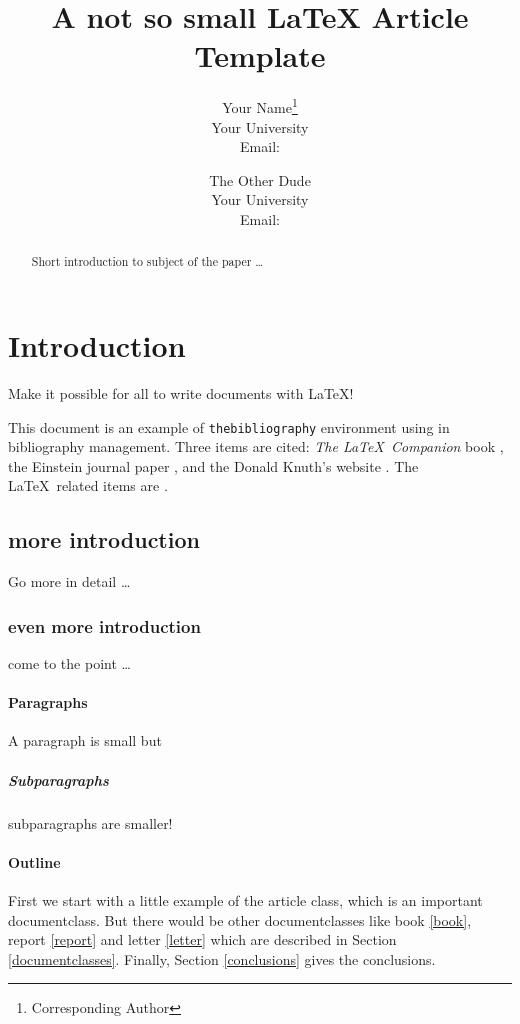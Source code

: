 \documentclass[11pt, a4paper, twoside]{article}
\title{A not so small \LaTeX{} Article Template}
\author{Your Name\thanks{Corresponding Author}  \\
	    Your University\\ Email:  \\
	\and 
	The Other Dude \\
	Your University\\ Email: \\
	}
\date{}
\begin{document}
\maketitle


\begin{abstract}
Short introduction to subject of the paper \ldots 
\end{abstract}




\section{Introduction}
Make it possible for all to write documents with \LaTeX{}!

This document is an example of \texttt{thebibliography} environment using 
in bibliography management. Three items are cited: \textit{The \LaTeX\ Companion} 
book \cite{latexcompanion}, the Einstein journal paper \cite{einstein}, and the 
Donald Knuth's website \cite{knuthwebsite}. The \LaTeX\ related items are
\cite{latexcompanion,knuthwebsite}. 

\subsection{more introduction}
Go more in detail \ldots

\subsubsection{even more introduction}
come to the point \ldots

\paragraph{Paragraphs}
A paragraph is small but 

\subparagraph{Subparagraphs}
subparagraphs are smaller! 

\paragraph{Outline}
First we start with a little example of the article class, which is an 
important documentclass. But there would be other documentclasses like 
book \ref{book}, report \ref{report} and letter \ref{letter} which are 
described in Section \ref{documentclasses}. Finally, Section 
\ref{conclusions} gives the conclusions.
\end{document}
